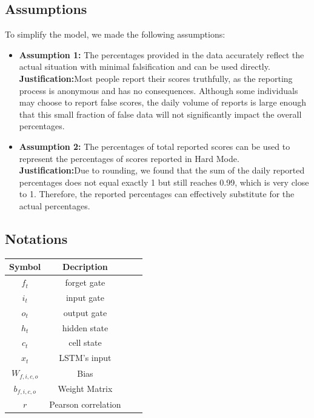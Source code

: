 \documentclass{mcmthesis}  %
\begin{document}
\subsection{Assumptions}
To simplify the model, we made the following assumptions:
\begin{itemize}
        \item \textbf{Assumption 1: }The percentages provided in the data accurately reflect the actual situation with minimal falsification and can be used directly.\\
        \textbf{Justification:}Most people report their scores truthfully, as the reporting process is anonymous and has no consequences. Although some individuals 
        may choose to report false scores, the daily volume of reports is large enough that this small fraction of false data will not significantly impact the overall percentages.
        \item \textbf{Assumption 2: }The percentages of total reported scores can be used to represent the percentages of scores reported in Hard Mode.\\
        \textbf{Justification:}Due to rounding, we found that the sum of the daily reported percentages does not equal exactly 1 but still reaches 0.99, which is 
        very close to 1. Therefore, the reported percentages can effectively substitute for the actual percentages.
\end{itemize}
\subsection{Notations}
\begin{table}[!h]  %
        \tabcolsep 84pt %
        \begin{tabular*}{\textwidth}{cccc}  %
        \toprule  %
        Symbol & Decription \\
        \midrule  %
        $f_{t}$ & forget gate  \\
        $i_{t}$ & input gate  \\
        $o_{t}$ & output gate  \\
        $h_{t}$ & hidden state  \\
        $c_{t}$ & cell state  \\
        $x_{t}$ & LSTM's input  \\
        $W_{f,i,c,o}$ & Bias  \\
        $b_{f,i,c,o}$ & Weight Matrix \\
        $r$ & Pearson correlation\\
        \bottomrule  %
        \end{tabular*}  %
\end{table}  %
\end{document}
